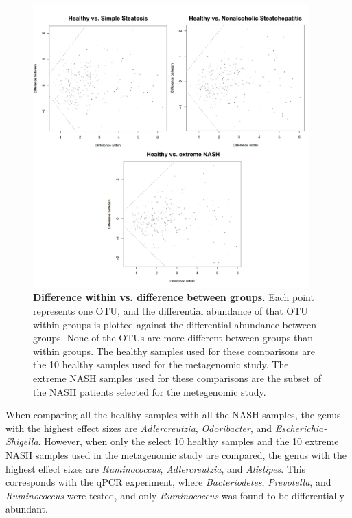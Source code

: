 \begin{figure}[h]
\begin{center}
\includegraphics[width=0.95\textwidth]{nafld_16s_aldex.png}
\caption{\textbf{Difference within vs. difference between groups.} Each point represents one OTU, and the differential abundance of that OTU within groups is plotted against the differential abundance between groups. None of the OTUs are more different between groups than within groups. The healthy samples used for these comparisons are the 10 healthy samples used for the metagenomic study. The extreme NASH samples used for these comparisons are the subset of the NASH patients selected for the metegenomic study.}
\end{center}
\label{nafld_fig3}
\end{figure}

When comparing all the healthy samples with all the NASH samples, the genus with the highest effect sizes are \textit{Adlercreutzia}, \textit{Odoribacter}, and \textit{Escherichia-Shigella}. However, when only the select 10 healthy samples and the 10 extreme NASH samples used in the metagenomic study are compared, the genus with the highest effect sizes are \textit{Ruminococcus}, \textit{Adlercreutzia}, and \textit{Alistipes}. This corresponds with the qPCR experiment, where \textit{Bacteriodetes}, \textit{Prevotella}, and \textit{Ruminococcus} were tested, and only \textit{Ruminococcus} was found to be differentially abundant.

